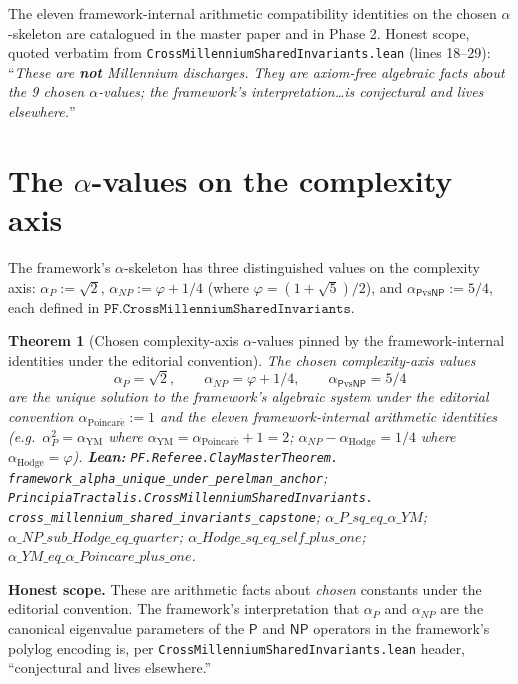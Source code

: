 \documentclass[11pt,a4paper]{article}
\theoremstyle{plain}
\newtheorem{theorem}{Theorem}[section]
\theoremstyle{definition}
\begin{document}
The eleven framework-internal arithmetic compatibility identities on
the chosen $\alpha$-skeleton are catalogued in the master paper and
in Phase 2. Honest scope, quoted verbatim from
\texttt{CrossMillenniumSharedInvariants.lean} (lines 18--29):
``\emph{These are \textbf{not} Millennium discharges. They are
axiom-free algebraic facts about the 9 chosen $\alpha$-values; the
framework's interpretation\ldots is conjectural and lives elsewhere.}''

\section{The $\alpha$-values on the complexity axis}
\label{sec:alpha-complexity}

The framework's $\alpha$-skeleton has three distinguished values on
the complexity axis: $\alpha_{P} := \sqrt{2}$, $\alpha_{NP} := \varphi
+ 1/4$ (where $\varphi = (1 + \sqrt{5})/2$), and
$\alpha_{\mathsf{P}\mathrm{vs}\mathsf{NP}} := 5/4$, each defined in
$\mathtt{PF.CrossMillenniumSharedInvariants}$.

\begin{theorem}[Chosen complexity-axis $\alpha$-values pinned by the
framework-internal identities under the editorial convention]
\label{thm:forced-complexity}
The chosen complexity-axis values
\[
\alpha_{P} = \sqrt{2}, \qquad
\alpha_{NP} = \varphi + 1/4, \qquad
\alpha_{\mathsf{P}\mathrm{vs}\mathsf{NP}} = 5/4
\]
are the unique solution to the framework's algebraic system under the
editorial convention $\alpha_{\mathrm{Poincar\acute e}} := 1$ and the
eleven framework-internal arithmetic identities (e.g.\
$\alpha_{P}^{2} = \alpha_{\mathrm{YM}}$ where
$\alpha_{\mathrm{YM}} = \alpha_{\mathrm{Poincar\acute e}} + 1 = 2$;
$\alpha_{NP} - \alpha_{\mathrm{Hodge}} = 1/4$ where
$\alpha_{\mathrm{Hodge}} = \varphi$).
\textbf{Lean:}
\texttt{PF.Referee.ClayMasterTheorem.\\
framework\_alpha\_unique\_under\_perelman\_anchor};
\texttt{PrincipiaTractalis.CrossMillenniumSharedInvariants.\\
cross\_millennium\_shared\_invariants\_capstone};
$\alpha\_P\_sq\_eq\_\alpha\_YM$;
$\alpha\_NP\_sub\_Hodge\_eq\_quarter$;
$\alpha\_Hodge\_sq\_eq\_self\_plus\_one$;
$\alpha\_YM\_eq\_\alpha\_Poincare\_plus\_one$.
\end{theorem}

\noindent\textbf{Honest scope.} These are arithmetic facts about
\emph{chosen} constants under the editorial convention. The
framework's interpretation that $\alpha_{P}$ and $\alpha_{NP}$ are
the canonical eigenvalue parameters of the $\mathsf{P}$ and
$\mathsf{NP}$ operators in the framework's polylog encoding is, per
\texttt{CrossMillenniumSharedInvariants.lean} header, ``conjectural
and lives elsewhere.''
\end{document}
